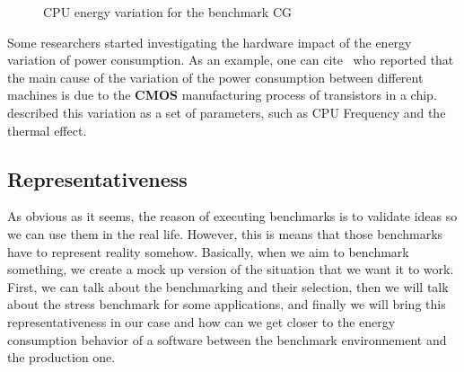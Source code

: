 \begin{figure}%
    \caption{CPU energy variation for the benchmark \textsf{CG}}\label{fig:motivation}
\end{figure}

Some researchers started investigating the hardware impact of the energy variation of power consumption.
As an example, one can cite~\cite{borkar_designing_2005,tschanz_adaptive_2002} who reported that the main cause of the variation of the power consumption between different machines is due to the \textbf{CMOS} manufacturing process of transistors in a chip.
\cite{heinrich_predicting} described this variation as a set of parameters, such as CPU Frequency and the thermal effect.


\subsection{Representativeness}
As obvious as it seems, the reason of executing benchmarks is to validate ideas so we can use them in the real life.
However, this is means that those benchmarks have to represent reality somehow.
Basically, when we aim to benchmark something, we create a mock up version of the situation that we want it to work.
First, we can talk about the benchmarking and their selection, then we will talk about the stress benchmark for some applications, and finally we will bring this representativeness in our case and how can we get closer to the energy consumption behavior of a software between the benchmark environnement and the production one.

